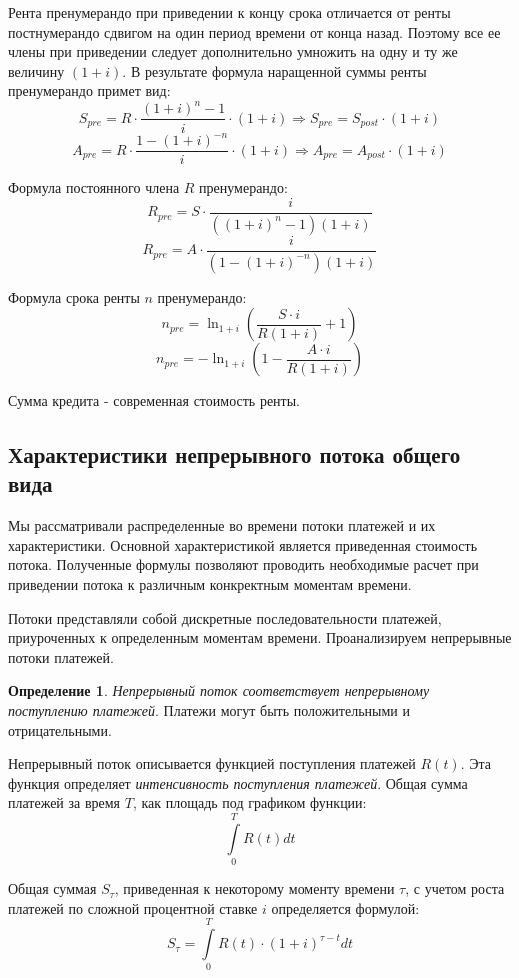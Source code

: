\documentclass[aps,%
12pt,%
final,%
oneside,
onecolumn,%
musixtex, %
superscriptaddress,%
centertags]{article} %
\theoremstyle{plain}
\theoremstyle{definition}
\newtheorem{definition}{Определение}[subsection]
\theoremstyle{remark}
\begin{document}
Рента пренумерандо при приведении к концу срока отличается от ренты постнумерандо сдвигом на один период времени от конца назад. Поэтому все ее члены при приведении следует дополнительно умножить на одну и ту же величину $(1 + i)$. В результате формула наращенной суммы ренты пренумерандо примет вид:
$$S_{pre} = R \cdot \frac{(1+i)^n - 1 }{i} \cdot (1+i) \Rightarrow S_{pre} = S_{post} \cdot (1+i)$$
$$A_{pre} =  R \cdot \frac {1-(1+i)^{-n}}{i} \cdot (1+i) \Rightarrow A_{pre} = A_{post} \cdot (1+i)$$

Формула постоянного члена $R$ пренумерандо:
$$R_{pre} = S \cdot \frac{i}{((1+i)^n - 1) (1+i)}$$
$$R_{pre} = A \cdot \frac {i}{(1-(1+i)^{-n})(1+i)}$$

Формула срока ренты $n$ пренумерандо:
$$n_{pre} = \ln_{1+i} \left(\frac{S \cdot i}{R(1+i)} + 1 \right)$$
$$n_{pre} = -\ln_{1+i} \left(1 - \frac{A \cdot i}{R(1+i)}  \right)$$

Сумма кредита - современная стоимость ренты.


\subsection{Характеристики непрерывного потока общего вида}

Мы рассматривали распределенные во времени потоки платежей и их характеристики. Основной характеристикой является приведенная стоимость потока. Полученные формулы позволяют проводить необходимые расчет при приведении потока к различным конкректным моментам времени.

Потоки представляли собой дискретные последовательности платежей, приуроченных к определенным моментам времени. Проанализируем непрерывные потоки платежей.

\begin{definition}
	\textit{Непрерывный поток соответствует непрерывному поступлению платежей}. Платежи могут быть положительными и отрицательными.
\end{definition}

Непрерывный поток описывается функцией поступления платежей $R(t)$. Эта функция определяет \textit{интенсивность поступления платежей}. Общая сумма платежей за время $T$, как площадь под графиком функции:
$$\int\limits_0^T R(t)dt$$

Общая суммая $S_{\tau}$, приведенная к некоторому моменту времени $\tau$, с учетом роста платежей по сложной процентной ставке $i$ определяется формулой:
$$S_{\tau} = \int\limits_0^T R(t) \cdot (1+i)^{\tau - t}dt$$
\end{document}
